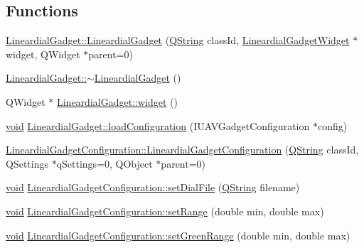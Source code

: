 \subsection*{\-Functions}
\begin{DoxyCompactItemize}
\item 
\hyperlink{group___linear_dial_plugin_gae00c0aad0b87c017df5b0305d6fb1c5b}{\-Lineardial\-Gadget\-::\-Lineardial\-Gadget} (\hyperlink{group___u_a_v_objects_plugin_gab9d252f49c333c94a72f97ce3105a32d}{\-Q\-String} class\-Id, \hyperlink{class_lineardial_gadget_widget}{\-Lineardial\-Gadget\-Widget} $\ast$widget, \-Q\-Widget $\ast$parent=0)
\item 
\hyperlink{group___linear_dial_plugin_gaee31b5207ca412de6722401f392a8fd0}{\-Lineardial\-Gadget\-::$\sim$\-Lineardial\-Gadget} ()
\item 
\-Q\-Widget $\ast$ \hyperlink{group___linear_dial_plugin_ga65e61a0bf52e2ab9b2fe4ba7e3ae3b96}{\-Lineardial\-Gadget\-::widget} ()
\item 
\hyperlink{group___u_a_v_objects_plugin_ga444cf2ff3f0ecbe028adce838d373f5c}{void} \hyperlink{group___linear_dial_plugin_ga6bdccc9d4347fd8f04ea5e893877a30f}{\-Lineardial\-Gadget\-::load\-Configuration} (\-I\-U\-A\-V\-Gadget\-Configuration $\ast$config)
\item 
\hyperlink{group___linear_dial_plugin_ga49b8e3de979573e8574a47a355fb537f}{\-Lineardial\-Gadget\-Configuration\-::\-Lineardial\-Gadget\-Configuration} (\hyperlink{group___u_a_v_objects_plugin_gab9d252f49c333c94a72f97ce3105a32d}{\-Q\-String} class\-Id, \-Q\-Settings $\ast$q\-Settings=0, \-Q\-Object $\ast$parent=0)
\item 
\hyperlink{group___u_a_v_objects_plugin_ga444cf2ff3f0ecbe028adce838d373f5c}{void} \hyperlink{group___linear_dial_plugin_ga20902ca5cb846c1c93ac9d0ef3799eca}{\-Lineardial\-Gadget\-Configuration\-::set\-Dial\-File} (\hyperlink{group___u_a_v_objects_plugin_gab9d252f49c333c94a72f97ce3105a32d}{\-Q\-String} filename)
\item 
\hyperlink{group___u_a_v_objects_plugin_ga444cf2ff3f0ecbe028adce838d373f5c}{void} \hyperlink{group___linear_dial_plugin_gaa4baee59ed6a862a9c31f64b2349acdc}{\-Lineardial\-Gadget\-Configuration\-::set\-Range} (double min, double max)
\item 
\hyperlink{group___u_a_v_objects_plugin_ga444cf2ff3f0ecbe028adce838d373f5c}{void} \hyperlink{group___linear_dial_plugin_ga126eafb9e37022d0160d544665e9687d}{\-Lineardial\-Gadget\-Configuration\-::set\-Green\-Range} (double min, double max)
\item 

\end{DoxyCompactItemize}
